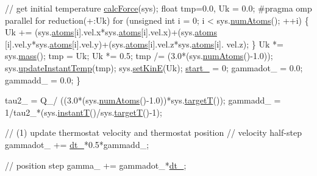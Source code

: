 \begin{DoxyCode}
        \textcolor{comment}{// get initial temperature}
        \hyperlink{classintegrator_ad630bf7c9b7339fa34f36fe43b0d9e3c}{calcForce}(sys);
        \textcolor{keywordtype}{float} tmp=0.0, Uk = 0.0;
\textcolor{preprocessor}{        #pragma omp parallel for reduction(+:Uk)}
\textcolor{preprocessor}{}        \textcolor{keywordflow}{for} (\textcolor{keywordtype}{unsigned} \textcolor{keywordtype}{int} i = 0; i < sys.\hyperlink{classsystem_definition_ae8d3c2df2d56241cee03fcc4e2026ae0}{numAtoms}(); ++i) \{
            Uk += (sys.\hyperlink{classsystem_definition_ae8814d3f60fc1111af2a3f218a4bfcab}{atoms}[i].vel.x*sys.\hyperlink{classsystem_definition_ae8814d3f60fc1111af2a3f218a4bfcab}{atoms}[i].vel.x)+(sys.\hyperlink{classsystem_definition_ae8814d3f60fc1111af2a3f218a4bfcab}{atoms}
      [i].vel.y*sys.\hyperlink{classsystem_definition_ae8814d3f60fc1111af2a3f218a4bfcab}{atoms}[i].vel.y)+(sys.\hyperlink{classsystem_definition_ae8814d3f60fc1111af2a3f218a4bfcab}{atoms}[i].vel.z*sys.\hyperlink{classsystem_definition_ae8814d3f60fc1111af2a3f218a4bfcab}{atoms}[i].
      vel.z);
        \}
        Uk *= sys.\hyperlink{classsystem_definition_acb6dd3df121e3e5bc0eb41c32bd937bd}{mass}();
        tmp = Uk;
        Uk *= 0.5;
        tmp /= (3.0*(sys.\hyperlink{classsystem_definition_ae8d3c2df2d56241cee03fcc4e2026ae0}{numAtoms}()-1.0));
        sys.\hyperlink{classsystem_definition_a285e6cd1de35ed125eecb20f0f774ab3}{updateInstantTemp}(tmp);
        sys.\hyperlink{classsystem_definition_a2b2c236698886bd1d106be802b987b61}{setKinE}(Uk);
        \hyperlink{classintegrator_a5b3546a765d8a83b6db8a6d890ace480}{start\_} = 0;
        gammadot\_ = 0.0;
        gammadd\_ = 0.0;
    \}
    
    tau2\_ = Q\_/ ((3.0*(sys.\hyperlink{classsystem_definition_ae8d3c2df2d56241cee03fcc4e2026ae0}{numAtoms}()-1.0))*sys.\hyperlink{classsystem_definition_a3c958df2ab99c0cb75c740346a5a4b6f}{targetT}());
    gammadd\_ = 1/tau2\_*(sys.\hyperlink{classsystem_definition_af7b322cfc8abe7042fdbeb0af8e7aa7e}{instantT}()/sys.\hyperlink{classsystem_definition_a3c958df2ab99c0cb75c740346a5a4b6f}{targetT}()-1);
    
    \textcolor{comment}{// (1) update thermostat velocity and thermostat position}
    \textcolor{comment}{// velocity half-step}
    gammadot\_ += \hyperlink{classintegrator_a6e4712b8597e3c40124316d2e9dd5051}{dt\_}*0.5*gammadd\_;
    
    \textcolor{comment}{// position step}
    gamma\_ += gammadot\_*\hyperlink{classintegrator_a6e4712b8597e3c40124316d2e9dd5051}{dt\_};
    

\end{DoxyCode}
